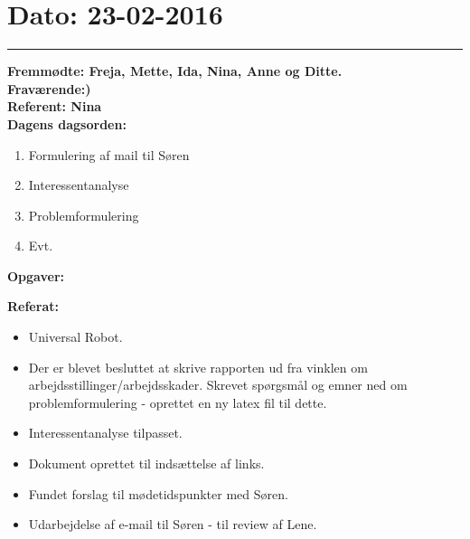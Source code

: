 \section{Dato: 23-02-2016}
\hrule
\textbf{Fremmødte: Freja, Mette, Ida, Nina, Anne og Ditte.} \\
\textbf{Fraværende:)} \\
\textbf{Referent: Nina } \\
\textbf{Dagens dagsorden: }
\begin{enumerate}
	\item Formulering af mail til Søren
	\item Interessentanalyse
	\item Problemformulering
	\item Evt. 
\end{enumerate}

\textbf{Opgaver:} \newline

\textbf{Referat:}
\begin{itemize}
	\item  Universal Robot.
	\item Der er blevet besluttet at skrive rapporten ud fra vinklen om arbejdsstillinger/arbejdsskader. Skrevet spørgsmål og emner ned om problemformulering - oprettet en ny latex fil til dette. 
	\item Interessentanalyse tilpasset. 
	\item Dokument oprettet til indsættelse af links.
	\item Fundet forslag til mødetidspunkter med Søren. 
	\item Udarbejdelse af e-mail til Søren - til review af Lene.
\end{itemize}

\newpage